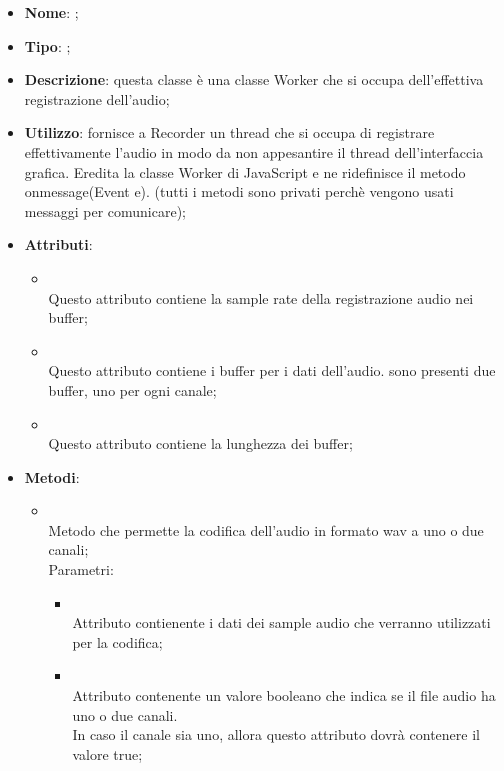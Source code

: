 \begin{itemize}
	\item \textbf{Nome}: ;
	\item \textbf{Tipo}: ;
	\item \textbf{Descrizione}: questa classe è una classe Worker che si occupa dell'effettiva registrazione dell'audio;
	\item \textbf{Utilizzo}: fornisce a Recorder un thread che si occupa di registrare effettivamente l'audio in modo da non appesantire il thread dell'interfaccia grafica.
Eredita la classe Worker di JavaScript e ne ridefinisce il metodo onmessage(Event e).
 (tutti i metodi sono privati perchè vengono usati messaggi per comunicare);
	\item \textbf{Attributi}:
	\begin{itemize}
		\item[]  \\
		Questo attributo contiene la sample rate della registrazione audio nei buffer;
		\item[]  \\
		Questo attributo contiene i buffer per i dati dell'audio. sono presenti due buffer, uno per ogni canale;
		\item[]  \\
		Questo attributo contiene la lunghezza dei buffer;
	\end{itemize}
	\item \textbf{Metodi}:
	\begin{itemize}
		\item[]  \\
		Metodo che permette la codifica dell'audio in formato wav a uno o due canali;\\
		Parametri:
		\begin{itemize}
			\item {} \\
			Attributo contienente i dati dei sample audio che verranno utilizzati per la codifica;
			\item {} \\
			Attributo contenente un valore booleano che indica se il file audio ha uno o due canali. \\
In caso il canale sia uno, allora questo attributo dovrà contenere il valore true;
		\end{itemize}

\end{itemize}
\end{itemize}
